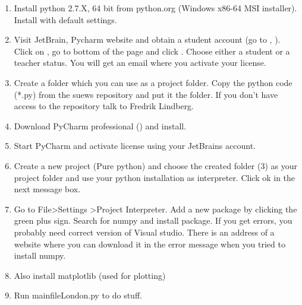 \documentclass[letterpaper,10pt,english]{sphinxmanual}
\begin{document}
\label{\detokenize{DevelopmentGuidelines:python-and-pycharm-not-so-good-alternative}}\begin{enumerate}
\item {} 
Install python 2.7.X, 64 bit from python.org (Windows x86-64 MSI
installer). Install with default settings.

\item {} 
Visit JetBrain, Pycharm website and obtain a student account (go to
,
). Click on , go to bottom of the page and click . Choose
either a student or a teacher status. You will get an email where you
activate your license.

\item {} 
Create a folder which you can use as a project folder. Copy the
python code (*.py) from the suews repository and put it the folder.
If you don’t have access to the repository talk to Fredrik Lindberg.

\item {} 
Download PyCharm professional
() and install.

\item {} 
Start PyCharm and activate license using your JetBrains account.

\item {} 
Create a new project (Pure python) and choose the created folder (3)
as your project folder and use your python installation as
interpreter. Click ok in the next message box.

\item {} 
Go to File\textgreater{}Settings \textgreater{}Project Interpreter. Add a new package by
clicking the green plus sign. Search for numpy and install package.
If you get errors, you probably need correct version of Visual
studio. There is an address of a website where you can download it in
the error message when you tried to install numpy.

\item {} 
Also install matplotlib (used for plotting)

\item {} 
Run mainfileLondon.py to do stuff.

\end{enumerate}
\end{document}
